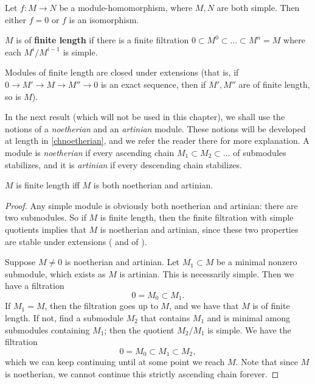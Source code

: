 \begin{exercise} Let $f: M \to N$ be a module-homomorphism,
where $M, N$ are both simple. Then either $f =0$ or $f$ is an isomorphism. 
\end{exercise} 

\begin{definition} 
$M$ is of \textbf{finite length} if there is a finite filtration $0 \subset M^0
\subset \dots \subset M^n = M$ where each $M^i/M^{i-1}$ is simple.
\end{definition} 

\begin{exercise} 
Modules of finite length are closed under extensions (that is, if $0 \to M'
\to M \to M'' \to 0$ is an exact sequence, then if $M', M''$ are of finite
length, so is $M$).  
\end{exercise} 

In the next result (which will not be used in this chapter), we shall use the
notions of a \emph{noetherian} and an \emph{artinian} module. These notions
will be developed at length in \cref{chnoetherian}, and we refer the reader
there for more explanation. 
A module is \emph{noetherian} if every ascending chain $M_1 \subset M_2 \subset
\dots$ of submodules stabilizes, and it is \emph{artinian} if every descending chain
stabilizes.
\begin{proposition} 
$M$ is finite length iff $M$ is both noetherian and artinian.
\end{proposition} 
\begin{proof} 
Any simple module is obviously both noetherian and artinian: there are two
submodules. So if $M$ is finite length, then the finite filtration with simple
quotients implies that $M$ is noetherian and artinian, since these two
properties are stable under extensions (
and  of ).

Suppose $M \neq 0$ is noetherian and artinian. Let $M_1 \subset M$ be a minimal
nonzero submodule, which exists as $M$ is artinian. This is necessarily simple. Then we have a filtration
\[ 0 = M_0 \subset M_1.  \]
If $M_1 = M$, then the filtration goes up to $M$, and we have that $M$ is of
finite length. If not, find a submodule $M_2$ that contains $M_1$ and is
minimal among submodules containing $M_1$; then the quotient
$M_2/M_1$ is simple. We have the filtration
\[ 0 = M_0 \subset M_1 \subset M_2,  \]
which we can keep continuing until at some point we reach $M$. Note that since
$M$ is noetherian, we cannot continue this strictly ascending chain forever. 
\end{proof} 

